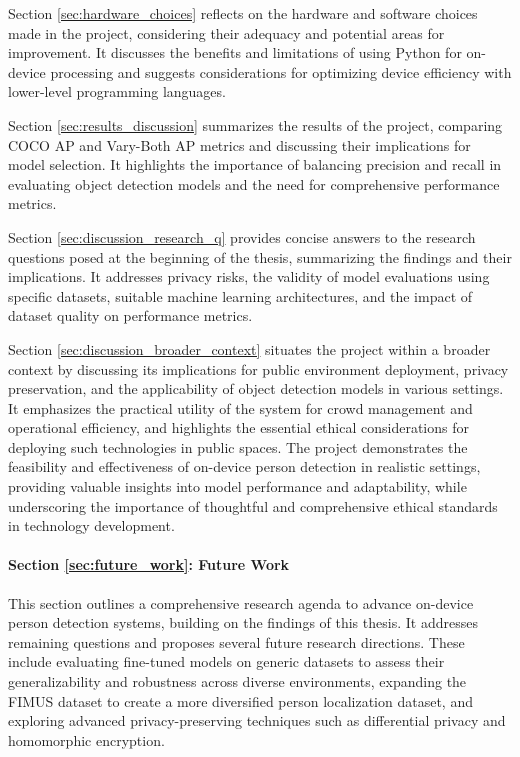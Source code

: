 Section \ref{sec:hardware_choices} reflects on the hardware and software choices made in the project, considering their adequacy and potential areas for improvement. It discusses the benefits and limitations of using Python for on-device processing and suggests considerations for optimizing device efficiency with lower-level programming languages.

Section \ref{sec:results_discussion} summarizes the results of the project, comparing COCO AP and Vary-Both AP metrics and discussing their implications for model selection. It highlights the importance of balancing precision and recall in evaluating object detection models and the need for comprehensive performance metrics.

Section \ref{sec:discussion_research_q} provides concise answers to the research questions posed at the beginning of the thesis, summarizing the findings and their implications. It addresses privacy risks, the validity of model evaluations using specific datasets, suitable machine learning architectures, and the impact of dataset quality on performance metrics.

\newpage
Section \ref{sec:discussion_broader_context} situates the project within a broader context by discussing its implications for public environment deployment, privacy preservation, and the applicability of object detection models in various settings. It emphasizes the practical utility of the system for crowd management and operational efficiency, and highlights the essential ethical considerations for deploying such technologies in public spaces. The project demonstrates the feasibility and effectiveness of on-device person detection in realistic settings, providing valuable insights into model performance and adaptability, while underscoring the importance of thoughtful and comprehensive ethical standards in technology development.

\paragraph{Section \ref{sec:future_work}: Future Work}
This section outlines a comprehensive research agenda to advance on-device person detection systems, building on the findings of this thesis. It addresses remaining questions and proposes several future research directions. These include evaluating fine-tuned models on generic datasets to assess their generalizability and robustness across diverse environments, expanding the FIMUS dataset to create a more diversified person localization dataset, and exploring advanced privacy-preserving techniques such as differential privacy and homomorphic encryption.

